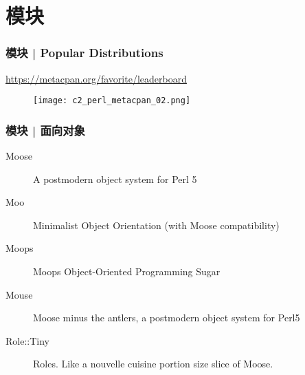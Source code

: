 \section{模块}
\begin{frame}
  \frametitle{模块 | Popular Distributions}
  \begin{center}
    \href{https://metacpan.org/favorite/leaderboard}{https://metacpan.org/favorite/leaderboard}
  \begin{figure}
    \texttt{[image: c2\_perl\_metacpan\_02.png]}
  \end{figure}
\end{center}
\end{frame}

\begin{frame}
  \frametitle{模块 | 面向对象}
    \begin{description}
      \item[Moose] A postmodern object system for Perl 5 
      \item[Moo] Minimalist Object Orientation (with Moose compatibility)
      \item[Moops] Moops Object-Oriented Programming Sugar
      \item[Mouse] Moose minus the antlers, a postmodern object system for Perl5
      \item[Role::Tiny] Roles. Like a nouvelle cuisine portion size slice of Moose.
    \end{description}
\end{frame}

